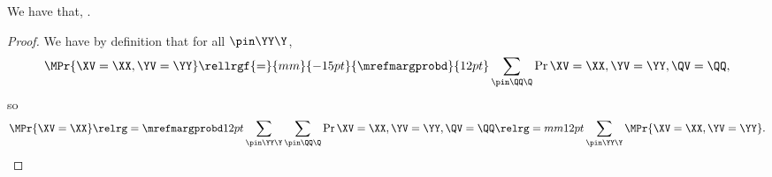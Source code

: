 \begin{proposition}
  \nrp
  We have that, \mprobgprop.%
\end{proposition}

\begin{proof}
  \nrp
  We have by definition that for all $\pin\YY\Y$,
  $$\MPr{\XV = \XX, \YV = \YY} \rellrgf{=}{mm}{-15pt}{\mrefmargprobd}{12pt} \sum_{\pin\QQ\Q}\Pr{\XV = \XX, \YV = \YY, \QV = \QQ},$$
  \nrp
  so
  $$\MPr{\XV = \XX} \relrg = {\mrefmargprobd} 12pt \sum_{\pin\YY\Y}\sum_{\pin\QQ\Q}\Pr{\XV = \XX, \YV = \YY, \QV = \QQ} \relrg = mm 12pt
  \sum_{\pin\YY\Y}\MPr{\XV = \XX, \YV = \YY}.$$%
\end{proof}
